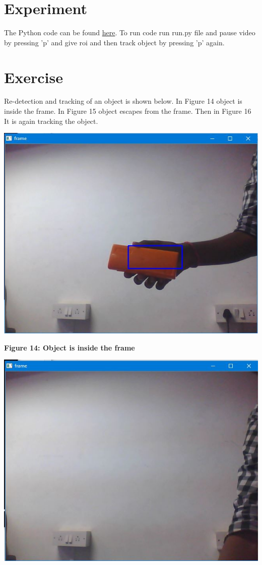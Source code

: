 \documentclass[11pt,a4paper]{article}
\begin{document}
	\section{Experiment}
	The Python code can be found \href{}{here}. To run code run run.py file and pause video by pressing 'p' and give roi and then track object by pressing 'p' again.
	\section{Exercise}
	Re-detection and tracking of an object  is shown below. In Figure 14 object is inside the frame. In Figure 15 object escapes from the frame. Then in Figure 16 It is again tracking the object.
	\begin{center}
		\includegraphics[scale=0.8]{Image1.jpg}
	\end{center}
	\begin{center}
		\textbf{Figure 14: Object is inside the frame}
	\end{center}
	\begin{center}
		\includegraphics[scale=0.8]{Image2.JPG}
	\end{center}
\end{document}
